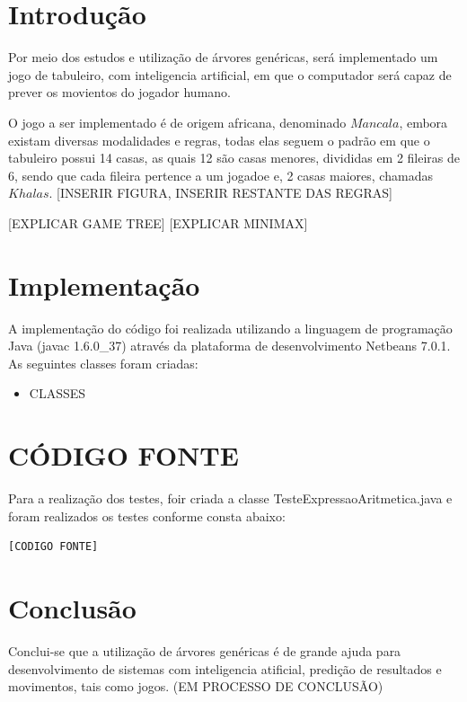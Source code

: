 \documentclass[a4paper,11pt]{article}
\begin{document}
\section{Introdução} 
Por meio dos estudos e utilização de árvores genéricas, será implementado um jogo de tabuleiro, com inteligencia artificial, em que o computador será capaz de prever os movientos do jogador humano.

O jogo a ser implementado é de origem africana, denominado $Mancala$, embora existam diversas modalidades e regras, todas elas seguem o padrão em que o tabuleiro possui 14 casas, as quais 12 são casas menores, divididas em 2 fileiras de 6, sendo que cada fileira pertence a um jogadoe e, 2 casas maiores, chamadas $Khalas$. [INSERIR FIGURA, INSERIR RESTANTE DAS REGRAS]

[EXPLICAR GAME TREE]
[EXPLICAR MINIMAX] 



\section{Implementação}
A implementação do código foi realizada utilizando a linguagem de programação Java (javac 1.6.0\_37) através da plataforma de desenvolvimento Netbeans 7.0.1.\\

As seguintes classes foram criadas:
\begin{itemize}
  \item CLASSES
\end{itemize}

\section{CÓDIGO FONTE}
Para a realização dos testes, foir criada a classe TesteExpressaoAritmetica.java e foram realizados os testes conforme consta abaixo:
\begin{lstlisting}
[CODIGO FONTE]
\end{lstlisting}

\section{Conclusão}
Conclui-se que a utilização de árvores genéricas é de grande ajuda para desenvolvimento de sistemas com inteligencia atificial, predição de resultados e movimentos, tais como jogos.
(EM PROCESSO DE CONCLUSÃO)


\nocite{*}					%
		
		
\end{document}
